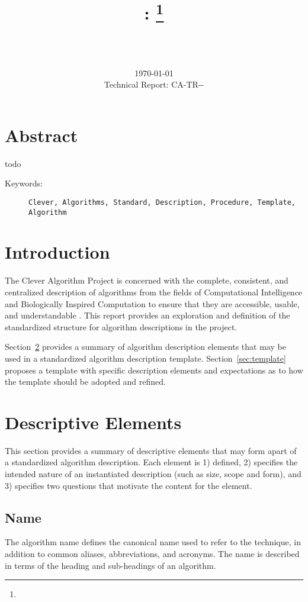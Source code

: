 \documentclass[a4paper, 11pt]{article}
\title{{\myreporttitle}: {\myreportsubtitle}\footnote{\myreportlicense}}
\author{\myreportauthor\\{\myreportemail}\\\small\myreportproject}
\date{\today\\{\small{Technical Report: CA-TR-{\myreportdate}-\myreportversion}}}
\begin{document}
\maketitle

\section*{Abstract} 
todo

\begin{description}
	\item[Keywords:] {\small\texttt{Clever, Algorithms, Standard, Description, Procedure, Template, Algorithm}}
\end{description} 

\section{Introduction}
\label{sec:introduction}
The Clever Algorithm Project is concerned with the complete, consistent, and centralized description of algorithms from the fields of Computational Intelligence and Biologically Inspired Computation to ensure that they are accessible, usable, and understandable \cite{Brownlee2010}.
This report provides an exploration and definition of the standardized structure for algorithm descriptions in the project.

Section~\ref{sec:elements} provides a summary of algorithm description elements that may be used in a standardized algorithm description template. Section~\ref{sec:template} proposes a template with specific description elements and expectations as to how the template should be adopted and refined.

\section{Descriptive Elements}
\label{sec:elements}
This section provides a summary of descriptive elements that may form apart of a standardized algorithm description. Each element is 1) defined, 2) specifies the intended nature of an instantiated description (such as size, scope and form), and 3) specifies two questions that motivate the content for the element.

\subsection{Name}
The algorithm name defines the canonical name used to refer to the technique, in addition to common aliases, abbreviations, and acronyms. The name is described in terms of the heading and sub-headings of an algorithm.
\end{document}
